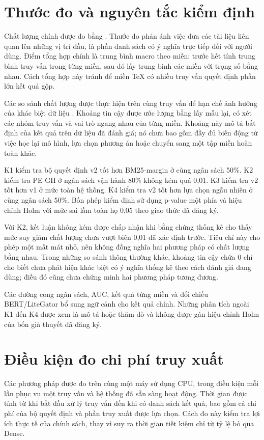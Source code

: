 \section{Thước đo và nguyên tắc kiểm định}
Chất lượng chính được đo bằng \ndcg{} \cite{ndcg2002}. Thước đo phản ánh việc đưa các tài liệu liên quan lên những vị trí đầu, là phần danh sách có ý nghĩa trực tiếp đối với người dùng. Điểm tổng hợp chính là trung bình macro theo miền: trước hết tính trung bình truy vấn trong từng miền, sau đó lấy trung bình các miền với trọng số bằng nhau. Cách tổng hợp này tránh để miền TeX có nhiều truy vấn quyết định phần lớn kết quả gộp.

Các so sánh chất lượng được thực hiện trên cùng truy vấn để hạn chế ảnh hưởng của khác biệt dữ liệu \cite{smucker2007,urbano2019}. Khoảng tin cậy được ước lượng bằng lấy mẫu lại, có xét các nhóm truy vấn và vai trò ngang nhau của từng miền. Khoảng này mô tả bất định của kết quả trên dữ liệu đã đánh giá; nó chưa bao gồm đầy đủ biến động từ việc học lại mô hình, lựa chọn phương án hoặc chuyển sang một tập miền hoàn toàn khác.

K1 kiểm tra bộ quyết định v2 tốt hơn BM25-margin ở cùng ngân sách 50\%. K2 kiểm tra PE-GH ở ngân sách vận hành 80\% không kém \Hstar{} quá 0,01. K3 kiểm tra v2 tốt hơn v1 ở mức toàn hệ thống. K4 kiểm tra v2 tốt hơn lựa chọn ngẫu nhiên ở cùng ngân sách 50\%. Bốn phép kiểm định sử dụng p-value một phía và hiệu chỉnh Holm \cite{holm1979} với mức sai lầm toàn họ 0,05 theo giao thức đã đăng ký.

Với K2, kết luận không kém được chấp nhận khi bằng chứng thống kê cho thấy mức suy giảm chất lượng chưa vượt biên 0,01 đã xác định trước. Tiêu chí này cho phép một mất mát nhỏ, nên không đồng nghĩa hai phương pháp có chất lượng bằng nhau. Trong những so sánh thông thường khác, khoảng tin cậy chứa 0 chỉ cho biết chưa phát hiện khác biệt có ý nghĩa thống kê theo cách đánh giá đang dùng; điều đó cũng chưa chứng minh hai phương pháp tương đương.

Các đường cong ngân sách, AUC, kết quả từng miền và đối chiếu BERT/LiteGator bổ sung ngữ cảnh cho kết quả chính. Những phân tích ngoài K1 đến K4 được xem là mô tả hoặc thăm dò và không được gán hiệu chỉnh Holm của bốn giả thuyết đã đăng ký.

\section{Điều kiện đo chi phí truy xuất}
Các phương pháp được đo trên cùng một máy sử dụng CPU, trong điều kiện mỗi lần phục vụ một truy vấn và hệ thống đã sẵn sàng hoạt động. Thời gian được tính từ khi bắt đầu xử lý truy vấn đến khi có danh sách kết quả, bao gồm cả chi phí của bộ quyết định và phần truy xuất được lựa chọn. Cách đo này kiểm tra lợi ích thực tế của chính sách, thay vì suy ra thời gian tiết kiệm chỉ từ tỷ lệ bỏ qua Dense.

